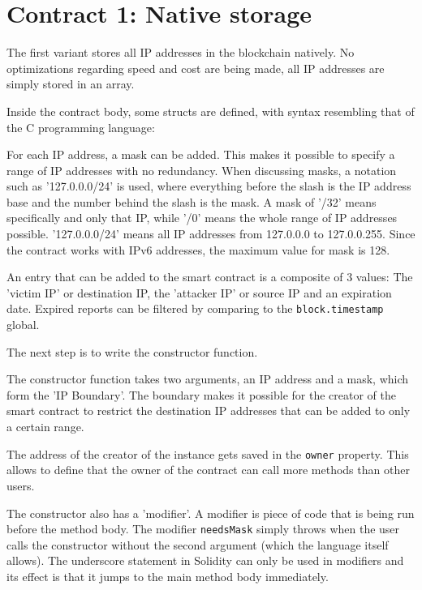 \section{Contract 1: Native storage}
The first variant stores all IP addresses in the blockchain natively. No optimizations regarding speed and cost are being made, all IP addresses are simply stored in an array.



Inside the contract body, some structs are defined, with syntax resembling that of the C programming language:



For each IP address, a mask can be added. This makes it possible to specify a range of IP addresses with no redundancy. 
When discussing masks, a notation such as '127.0.0.0/24' is used, where everything before the slash is the IP address base and the number behind the slash is the mask. A mask of '/32' means specifically and only that IP, while '/0' means the whole range of IP addresses possible. '127.0.0.0/24' means all IP addresses from 127.0.0.0 to 127.0.0.255. Since the contract works with IPv6 addresses, the maximum value for mask is 128.

An entry that can be added to the smart contract is a composite of 3 values: The 'victim IP' or destination IP, the 'attacker IP' or source IP and an expiration date. Expired reports can be filtered by comparing to the \texttt{block.timestamp} global.

The next step is to write the constructor function.



The constructor function takes two arguments, an IP address and a mask, which form the 'IP Boundary'. The boundary makes it possible for the creator of the smart contract to restrict the destination IP addresses that can be added to only a certain range.

The address of the creator of the instance gets saved in the \texttt{owner} property. This allows to define that the owner of the contract can call more methods than other users.

The constructor also has a 'modifier'. A modifier is piece of code that is being run before the method body. The modifier \texttt{needsMask} simply throws when the user calls the constructor without the second argument (which the language itself allows). The underscore statement in Solidity can only be used in modifiers and its effect is that it jumps to the main method body immediately.

